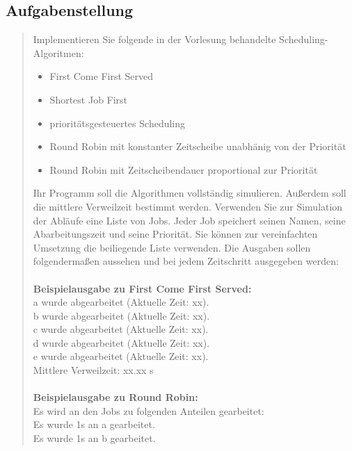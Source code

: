 	\subsection{Aufgabenstellung}
		\begin{quote}
			Implementieren Sie folgende in der Vorlesung behandelte Scheduling-Algoritmen:\\
			\begin{itemize}
				\item First Come First Served\\
				\item Shortest Job First\\
				\item priorit\"atsgesteuertes Scheduling\\
				\item Round Robin mit konstanter Zeitscheibe unabh\"anig von der Priorit\"at\\
				\item Round Robin mit Zeitscheibendauer proportional zur  Priorit\"at\\
			\end{itemize}
			Ihr Programm soll die Algorithmen vollst\"andig simulieren. Außerdem soll die mittlere Verweilzeit bestimmt werden. Verwenden Sie zur Simulation der Abl\"aufe eine Liste von	Jobs. Jeder Job speichert seinen Namen, seine Abarbeitungszeit und seine Priorit\"at. Sie k\"onnen zur vereinfachten Umsetzung die beiliegende Liste verwenden. Die Ausgaben sollen folgendermaßen aussehen und bei jedem Zeitschritt ausgegeben werden:\\ \\
			\textbf{Beispielausgabe zu First Come First Served:}\\
			a wurde abgearbeitet (Aktuelle Zeit: xx).\\
			b wurde abgearbeitet (Aktuelle Zeit: xx).\\
			c wurde abgearbeitet (Aktuelle Zeit: xx).\\
			d wurde abgearbeitet (Aktuelle Zeit: xx).\\
			e wurde abgearbeitet (Aktuelle Zeit: xx).\\
			Mittlere Verweilzeit: xx.xx s\\ \\
			\textbf{Beispielausgabe zu Round Robin:}\\
			Es wird an den Jobs zu folgenden Anteilen gearbeitet:\\
			Es wurde 1s an a gearbeitet.\\
			Es wurde 1s an b gearbeitet.\\

\end{quote}
